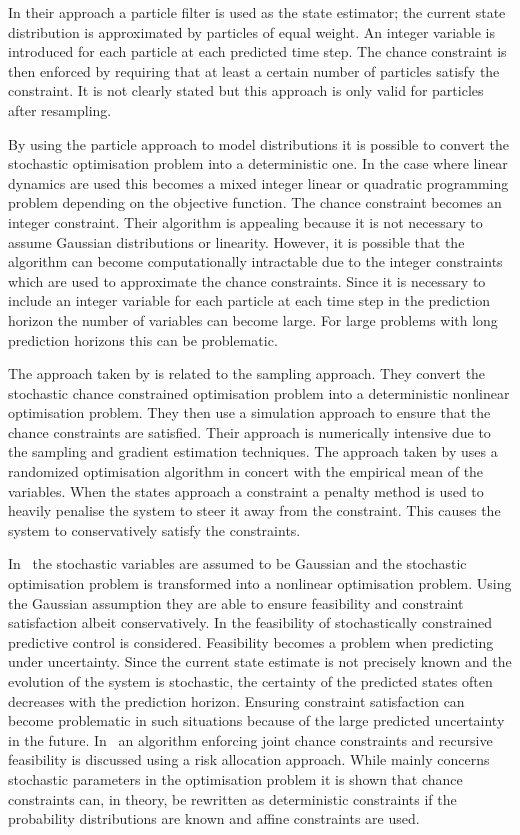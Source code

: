 In their approach a particle filter is used as the state estimator; the current state distribution is approximated by particles of equal weight. An integer variable is introduced for each particle at each predicted time step. The chance constraint is then enforced by requiring that at least a certain number of particles satisfy the constraint. It is not clearly stated but this approach is only valid for particles after resampling. 

By using the particle approach to model distributions it is possible to convert the stochastic optimisation problem into a deterministic one. In the case where linear dynamics are used this becomes a mixed integer linear or quadratic programming problem depending on the objective function. The chance constraint becomes an integer constraint. Their algorithm is appealing because it is not necessary to assume Gaussian distributions or linearity. However, it is possible that the algorithm can become computationally intractable due to the integer constraints which are used to approximate the chance constraints. Since it is necessary to include an integer variable for each particle at each time step in the prediction horizon the number of variables can become large. For large problems with long prediction horizons this can be problematic.  

The approach taken by \cite{li} is related to the sampling approach. They convert the stochastic chance constrained optimisation problem into a deterministic nonlinear optimisation problem. They then use a simulation approach to ensure that the chance constraints are satisfied. Their approach is numerically intensive due to the sampling and gradient estimation techniques. The approach taken by \cite{batina} uses a randomized optimisation algorithm in concert with the empirical mean of the variables. When the states approach a constraint a penalty method is used to heavily penalise the system to steer it away from the constraint. This causes the system to conservatively satisfy the constraints.

In~\cite{li2} the stochastic variables are assumed to be Gaussian and the stochastic optimisation problem is transformed into a nonlinear optimisation problem. Using the Gaussian assumption they are able to ensure feasibility and constraint satisfaction albeit conservatively. In \cite{masahiro} the feasibility of stochastically constrained predictive control is considered. Feasibility becomes a problem when predicting under uncertainty. Since the current state estimate is not precisely known and the evolution of the system is stochastic, the certainty of the predicted states often decreases with the prediction horizon. Ensuring constraint satisfaction can become problematic in such situations because of the large predicted uncertainty in the future. In~\cite{masahiro} an algorithm enforcing joint chance constraints and recursive feasibility is discussed using a risk allocation approach. While \cite{schwarm} mainly concerns stochastic parameters in the optimisation problem it is shown that chance constraints can, in theory, be rewritten as deterministic constraints if the probability distributions are known and affine constraints are used. 

